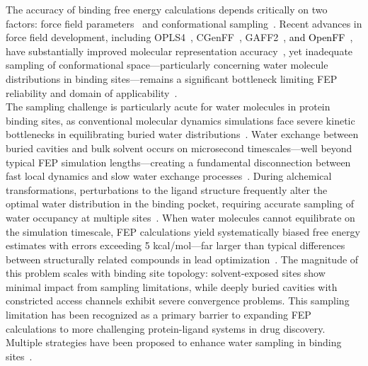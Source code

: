 \documentclass[journal=jacsat,manuscript=article]{achemso}
\newcommand*{\textblue}[1]{\textcolor{black}{#1}}
\begin{document}
The accuracy of binding free energy calculations depends critically on two factors: force field parameters~\cite{Ding2023, 17c36m, lu2021opls4, he2022recent, vanommeslaeghe2012automationI, vanommeslaeghe2012automationII} and conformational sampling~\cite{15rex, wang2011replica, hritz2008hamiltonian}. 
Recent advances in force field development, including OPLS4~\cite{lu2021opls4}, CGenFF~\cite{vanommeslaeghe2012automationI, vanommeslaeghe2012automationII}, GAFF2~\cite{he2022recent}, \textblue{and OpenFF~\cite{wang2024open,Boothroyd2023}}, have substantially improved molecular representation accuracy~\cite{Hahn_2024}, 
yet inadequate sampling of conformational space—particularly concerning water molecule distributions in binding sites—remains a significant bottleneck limiting FEP reliability and domain of applicability~\cite{ross2020enhancing}. \\
\newline
The sampling challenge is particularly acute for water molecules in protein binding sites, 
as conventional molecular dynamics simulations face severe kinetic bottlenecks in equilibrating buried water distributions~\cite{ross2020enhancing, BenShalom2019, ben2021fast}. 
Water exchange between buried cavities and bulk solvent occurs on microsecond timescales—well beyond typical FEP simulation lengths—creating a fundamental disconnection between fast local dynamics and slow water exchange processes~\cite{persson2008cell, kaieda2013internal}. 
During alchemical transformations, perturbations to the ligand structure frequently alter the optimal water distribution in the binding pocket, 
requiring accurate sampling of water occupancy at multiple sites~\cite{zhou2009theory, cozzini2004free,li2007water}. 
When water molecules cannot equilibrate on the simulation timescale, 
FEP calculations yield systematically biased free energy estimates with errors exceeding 5 kcal/mol—far larger than typical differences between structurally related compounds in lead optimization~\cite{ross2020enhancing}. 
The magnitude of this problem scales with binding site topology: solvent-exposed sites show minimal impact from sampling limitations, 
while deeply buried cavities with constricted access channels exhibit severe convergence problems. 
This sampling limitation has been recognized as a primary barrier to expanding FEP calculations to more challenging protein-ligand systems in drug discovery. \\
\newline
Multiple strategies have been proposed to enhance water sampling in binding sites~\cite{Wagle2024,ross2020enhancing,Ge2022,ben2021fast,Deng2024,Liu2025}. 
\end{document}
